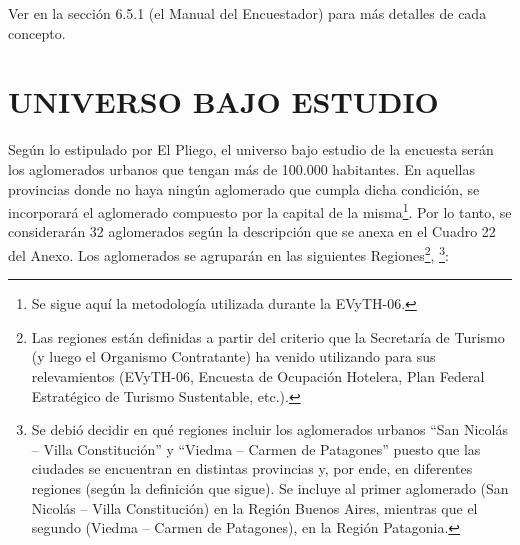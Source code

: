 \documentclass[
  openany]{book}
\begin{document}
Ver en la sección 6.5.1 (el Manual del Encuestador) para más detalles de cada concepto.

\hypertarget{universo-bajo-estudio}{%
\section{\texorpdfstring{\textbf{UNIVERSO BAJO ESTUDIO}}{UNIVERSO BAJO ESTUDIO}}\label{universo-bajo-estudio}}

Según lo estipulado por El Pliego, el universo bajo estudio de la encuesta serán los aglomerados urbanos que tengan más de 100.000 habitantes.
En aquellas provincias donde no haya ningún aglomerado que cumpla dicha condición, se incorporará el aglomerado compuesto por la capital de la misma\footnote{Se sigue aquí la metodología utilizada durante la EVyTH-06.}.
Por lo tanto, se considerarán 32 aglomerados según la descripción que se anexa en el Cuadro 22 del Anexo.
Los aglomerados se agruparán en las siguientes Regiones\footnote{Las regiones están definidas a partir del criterio que la Secretaría de Turismo (y luego el Organismo Contratante) ha venido utilizando para sus relevamientos (EVyTH-06, Encuesta de Ocupación Hotelera, Plan Federal Estratégico de Turismo Sustentable, etc.).},
\footnote{Se debió decidir en qué regiones incluir los aglomerados urbanos ``San Nicolás -- Villa Constitución'' y ``Viedma -- Carmen de Patagones'' puesto que las ciudades se encuentran en distintas provincias y, por ende, en diferentes regiones (según la definición que sigue).
  Se incluye al primer aglomerado (San Nicolás -- Villa Constitución) en la Región Buenos Aires, mientras que el segundo (Viedma -- Carmen de Patagones), en la Región Patagonia.}:
\end{document}

